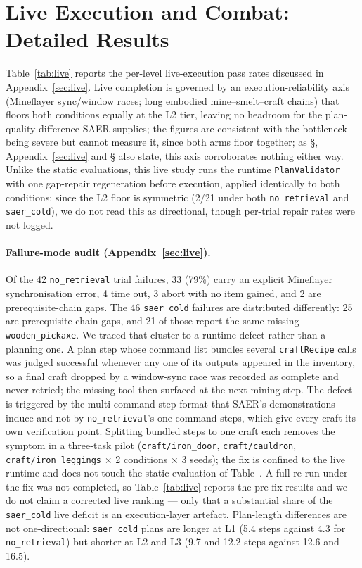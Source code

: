 \documentclass[letterpaper]{article} %
\newcommand{\appref}[1]{Appendix~\ref{#1}}
\newcommand{\bodyref}[1]{\getrefnumber{#1}}
\begin{document}
\section{Live Execution and Combat: Detailed Results}
\label{app:livecombat}
\label{app:live}

Table~\ref{tab:live} reports the per-level live-execution pass rates
discussed in \appref{sec:live}.  Live completion is governed by an
execution-reliability axis (Mineflayer sync/window races; long embodied
mine--smelt--craft chains) that floors both conditions equally at the L2
tier, leaving no headroom for the plan-quality difference SAER supplies;
the figures are consistent with the bottleneck being severe but cannot
measure it, since both arms floor together; as \S\bodyref{sec:intro},
\appref{sec:live} and \S\bodyref{sec:limits} also state, this axis corroborates
nothing either way.  Unlike the static evaluations, this live study runs the
runtime \texttt{PlanValidator} with one gap-repair regeneration before
execution, applied identically to both conditions; since the L2 floor
is symmetric (2/21 under both \texttt{no\_retrieval} and
\texttt{saer\_cold}), we do not read this as directional, though
per-trial repair rates were not logged.

\paragraph{Failure-mode audit (\appref{sec:live}).}
Of the 42 \texttt{no\_retrieval} trial failures, 33 (79\%) carry an
explicit Mineflayer synchronisation error, 4 time out, 3 abort with no
item gained, and 2 are prerequisite-chain gaps.  The 46
\texttt{saer\_cold} failures are distributed differently: 25 are
prerequisite-chain gaps, and 21 of those report the same missing
\texttt{wooden\_pickaxe}.  We traced that cluster to a runtime defect
rather than a planning one.  A plan step whose command list bundles
several \texttt{craftRecipe} calls was judged successful whenever any
one of its outputs appeared in the inventory, so a final craft dropped by
a window-sync race was recorded as complete and never retried; the
missing tool then surfaced at the next mining step.  The defect is
triggered by the multi-command step format that SAER's demonstrations
induce and not by \texttt{no\_retrieval}'s one-command steps, which
give every craft its own verification point.  Splitting bundled steps to
one craft each removes the symptom in a three-task pilot
(\texttt{craft/iron\_door}, \texttt{craft/cauldron},
\texttt{craft/iron\_leggings} $\times$ 2 conditions $\times$ 3 seeds);
the fix is confined to the live runtime and does not touch the static
evaluation of Table~\bodyref{tab:main}.  A full re-run under the fix was not completed, so
Table~\ref{tab:live} reports the pre-fix results and we do not claim a
corrected live ranking --- only that a substantial share of the
\texttt{saer\_cold} live deficit is an execution-layer artefact.  Plan-length
differences are not one-directional: \texttt{saer\_cold} plans are
longer at L1 (5.4 steps against 4.3 for \texttt{no\_retrieval}) but shorter
at L2 and L3 (9.7 and 12.2 steps against 12.6 and 16.5).
\end{document}
